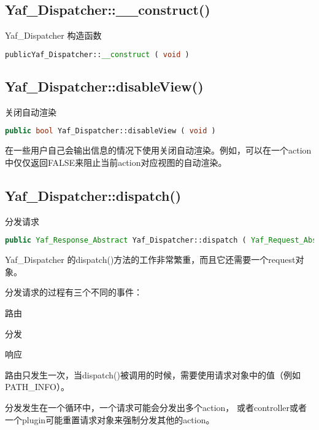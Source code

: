 \subsection{Yaf\_Dispatcher::\_\_construct()}

Yaf\_Dispatcher 构造函数

\begin{lstlisting}[language=PHP]
publicYaf_Dispatcher::__construct ( void )
\end{lstlisting}



\subsection{Yaf\_Dispatcher::disableView()}

关闭自动渲染


\begin{lstlisting}[language=PHP]
public bool Yaf_Dispatcher::disableView ( void )
\end{lstlisting}

在一些用户自己会输出信息的情况下使用关闭自动渲染。例如，可以在一个action中仅仅返回FALSE来阻止当前action对应视图的自动渲染。


\subsection{Yaf\_Dispatcher::dispatch()}

分发请求


\begin{lstlisting}[language=PHP]
public Yaf_Response_Abstract Yaf_Dispatcher::dispatch ( Yaf_Request_Abstract $request )
\end{lstlisting}

Yaf\_Dispatcher 的dispatch()方法的工作非常繁重，而且它还需要一个request对象。

分发请求的过程有三个不同的事件：

\begin{compactitem}
\item 路由
\item 分发
\item 响应
\end{compactitem}

路由只发生一次，当dispatch()被调用的时候，需要使用请求对象中的值（例如PATH\_INFO）。

分发发生在一个循环中，一个请求可能会分发出多个action， 或者controller或者一个plugin可能重置请求对象来强制分发其他的action。 

